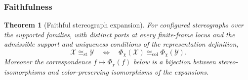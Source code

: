 \documentclass[pdflatex,sn-mathphys-num,referee,lineno]{sn-jnl}
\theoremstyle{plain}
\newtheorem{theorem}{Theorem}
\theoremstyle{remark}
\theoremstyle{definition}
\begin{document}
\subsubsection{Faithfulness}

\begin{theorem}[Faithful stereograph expansion]
\label{thm:faithful-expansion}
For configured stereographs over the supported families, with distinct ports at
every finite-frame locus and the admissible support and uniqueness conditions
of the representation definition,
\[
  \mathcal X\cong_{\mathrm{st}}\mathcal Y
  \quad\Longleftrightarrow\quad
  \Phi_\chi(\mathcal X)\cong_{\mathrm{col}}\Phi_\chi(\mathcal Y).
\]
Moreover the correspondence \(f\mapsto\Phi_\chi(f)\) below is a bijection
between stereo-isomorphisms and color-preserving isomorphisms of the
expansions.
\end{theorem}
\end{document}
